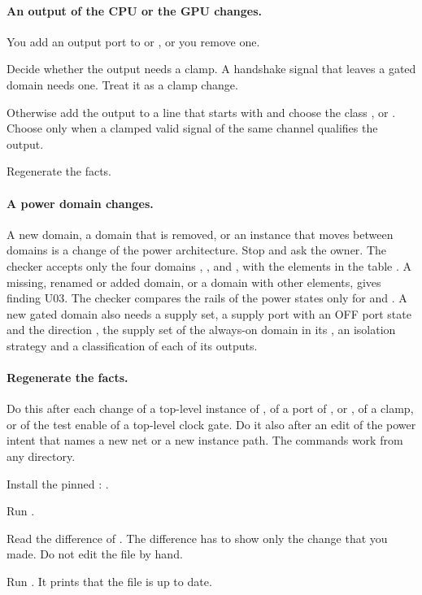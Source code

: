 \paragraph{An output of the CPU or the GPU changes.} You add an output port to  or , or you remove one.
\begin{procedure}
  \item Decide whether the output needs a clamp. A handshake signal that leaves a gated domain needs one. Treat it as a clamp change.
  \item Otherwise add the output to a line that starts with  and choose the class ,  or . Choose  only when a clamped valid signal of the same channel qualifies the output.
  \item Regenerate the facts.
\end{procedure}

\paragraph{A power domain changes.} A new domain, a domain that is removed, or an instance that moves between domains is a change of the power architecture. Stop and ask the owner. The checker accepts only the four domains , ,  and , with the elements in the table . A missing, renamed or added domain, or a domain with other elements, gives finding U03. The checker compares the rails of the power states only for  and . A new gated domain also needs a supply set, a supply port with an OFF port state and the direction , the supply set of the always-on domain in its , an isolation strategy and a classification of each of its outputs.

\paragraph{Regenerate the facts.} Do this after each change of a top-level instance of , of a port of ,  or , of a clamp, or of the test enable of a top-level clock gate. Do it also after an edit of the power intent that names a new net or a new instance path. The commands work from any directory.
\begin{procedure}
  \item Install the pinned : .
  \item Run .
  \item Read the difference of . The difference has to show only the change that you made. Do not edit the file by hand.
  \item Run . It prints that the file is up to date.
\end{procedure}

